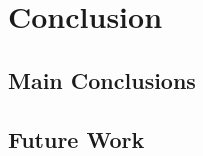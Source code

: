 \section{Conclusion}
\label{sec:conclusion}

\subsection{Main Conclusions}
\label{sec:mainconclusions}

\vspace{1cm}
\begin{center}
  \begin{Huge}
    [CONCLUSION]
  \end{Huge}
\end{center}
\vspace{1cm}

\subsection{Future Work}
\label{subsec:futurework}

\vspace{1cm}
\begin{center}
  \begin{Huge}
    [FUTURE]
  \end{Huge}
\end{center}
\vspace{1cm}
